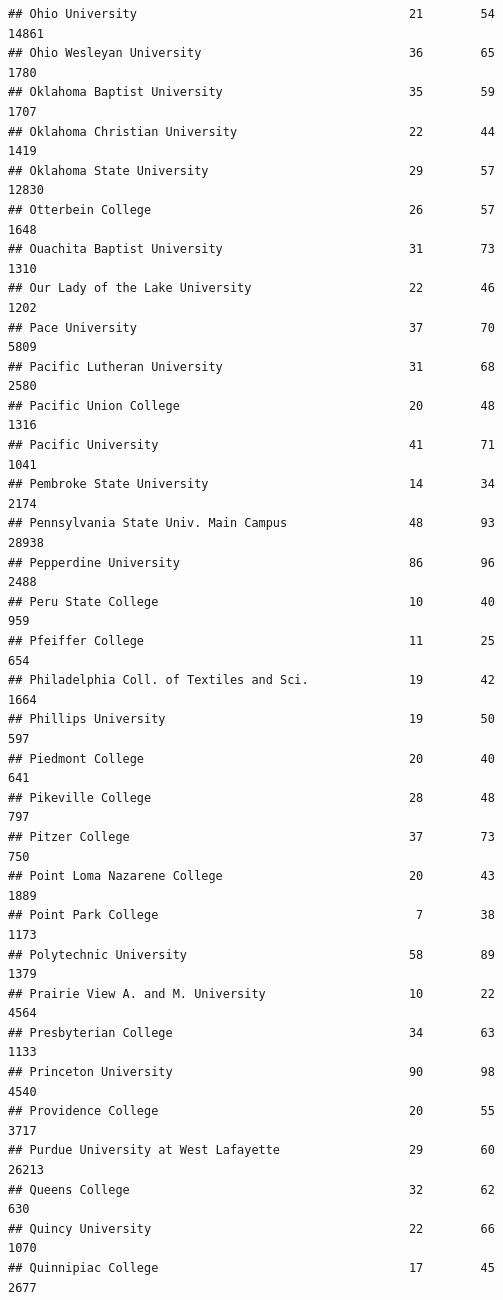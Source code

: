 \documentclass[
]{article}
\begin{document}
\begin{verbatim}
## Ohio University                                      21        54       14861
## Ohio Wesleyan University                             36        65        1780
## Oklahoma Baptist University                          35        59        1707
## Oklahoma Christian University                        22        44        1419
## Oklahoma State University                            29        57       12830
## Otterbein College                                    26        57        1648
## Ouachita Baptist University                          31        73        1310
## Our Lady of the Lake University                      22        46        1202
## Pace University                                      37        70        5809
## Pacific Lutheran University                          31        68        2580
## Pacific Union College                                20        48        1316
## Pacific University                                   41        71        1041
## Pembroke State University                            14        34        2174
## Pennsylvania State Univ. Main Campus                 48        93       28938
## Pepperdine University                                86        96        2488
## Peru State College                                   10        40         959
## Pfeiffer College                                     11        25         654
## Philadelphia Coll. of Textiles and Sci.              19        42        1664
## Phillips University                                  19        50         597
## Piedmont College                                     20        40         641
## Pikeville College                                    28        48         797
## Pitzer College                                       37        73         750
## Point Loma Nazarene College                          20        43        1889
## Point Park College                                    7        38        1173
## Polytechnic University                               58        89        1379
## Prairie View A. and M. University                    10        22        4564
## Presbyterian College                                 34        63        1133
## Princeton University                                 90        98        4540
## Providence College                                   20        55        3717
## Purdue University at West Lafayette                  29        60       26213
## Queens College                                       32        62         630
## Quincy University                                    22        66        1070
## Quinnipiac College                                   17        45        2677

\end{verbatim}
\end{document}
